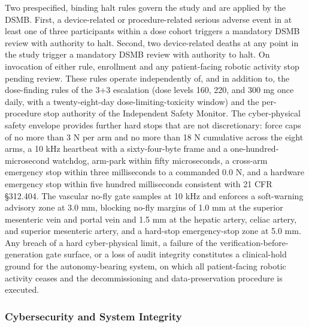 Two prespecified, binding halt rules govern the study and are applied by the DSMB.
First, a device-related or procedure-related serious adverse event in at least one
of three participants within a dose cohort triggers a mandatory DSMB review with
authority to halt. Second, two device-related deaths at any point in the study
trigger a mandatory DSMB review with authority to halt. On invocation of either
rule, enrollment and any patient-facing robotic activity stop pending review. These
rules operate independently of, and in addition to, the dose-finding rules of the
3+3 escalation (dose levels 160, 220, and 300 mg once daily, with a twenty-eight-day
dose-limiting-toxicity window) and the per-procedure stop authority of the
Independent Safety Monitor. The cyber-physical safety envelope provides further
hard stops that are not discretionary: force caps of no more than 3 N per arm and no
more than 18 N cumulative across the eight arms, a 10 kHz heartbeat with a
sixty-four-byte frame and a one-hundred-microsecond watchdog, arm-park within fifty
microseconds, a cross-arm emergency stop within three milliseconds to a commanded
0.0 N, and a hardware emergency stop within five hundred milliseconds consistent
with 21 CFR \S 312.404. The vascular no-fly gate samples at 10 kHz and enforces a
soft-warning advisory zone at 3.0 mm, blocking no-fly margins of 1.0 mm at the
superior mesenteric vein and portal vein and 1.5 mm at the hepatic artery, celiac
artery, and superior mesenteric artery, and a hard-stop emergency-stop zone at 5.0
mm. Any breach of a hard cyber-physical limit, a failure of the
verification-before-generation gate surface, or a loss of audit integrity
constitutes a clinical-hold ground for the autonomy-bearing system, on which all
patient-facing robotic activity ceases and the decommissioning and data-preservation
procedure is executed.

\subsubsection{Cybersecurity and System Integrity}

